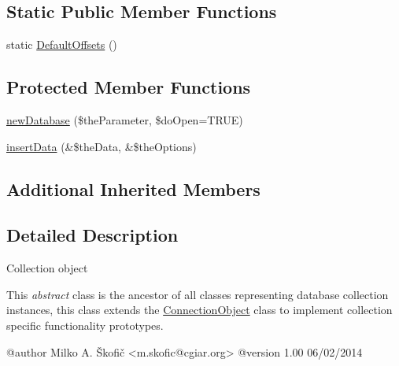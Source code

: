 \subsection*{Static Public Member Functions}
\begin{DoxyCompactItemize}
\item 
static \hyperlink{class_ontology_wrapper_1_1_collection_object_abae405620e85cc435942cd3b49e689b5}{Default\-Offsets} ()
\end{DoxyCompactItemize}
\subsection*{Protected Member Functions}
\begin{DoxyCompactItemize}
\item 
\hyperlink{class_ontology_wrapper_1_1_collection_object_a613793e54e0ff92c4e595bb34d539e70}{new\-Database} (\$the\-Parameter, \$do\-Open=T\-R\-U\-E)
\item 
\hyperlink{class_ontology_wrapper_1_1_collection_object_adc48ee44a9d36d23a9db87a8ab4e4eff}{insert\-Data} (\&\$the\-Data, \&\$the\-Options)
\end{DoxyCompactItemize}
\subsection*{Additional Inherited Members}


\subsection{Detailed Description}
Collection object

This {\itshape abstract} class is the ancestor of all classes representing database collection instances, this class extends the \hyperlink{class_ontology_wrapper_1_1_connection_object}{Connection\-Object} class to implement collection specific functionality prototypes. \begin{DoxyVerb} @author            Milko A. Škofič <m.skofic@cgiar.org>
 @version   1.00 06/02/2014\end{DoxyVerb}
 

